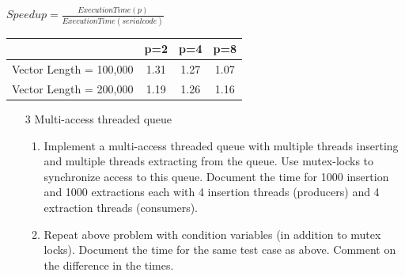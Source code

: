 \documentclass{sem5}
\begin{document}
\begin{center}
$Speedup = \frac{Execution Time(p)}{Execution Time(serial code)}$\\
\vspace*{1cm}
\begin{tabular}{|c|c|c|c|}
\hline
 & p=2 & p=4 & p=8\\
\hline
Vector Length = 100,000 & 1.31 & 1.27 & 1.07 \\
\hline
Vector Length = 200,000 & 1.19 & 1.26 & 1.16 \\
\hline
\end{tabular}
\end{center}
\begin{itemize}
\item[3] Multi-access threaded queue
\begin{enumerate}
\item Implement a multi-access threaded queue with multiple threads inserting and multiple threads extracting from the queue. Use mutex-locks to synchronize access to this queue. Document the time for 1000 insertion and 1000 extractions each with 4 insertion threads (producers) and 4 extraction threads (consumers).

\item Repeat above problem with condition variables (in addition to mutex locks). Document the time for the same test case as above. Comment on the difference in the times.

\end{enumerate}
\end{itemize}
\end{document}
